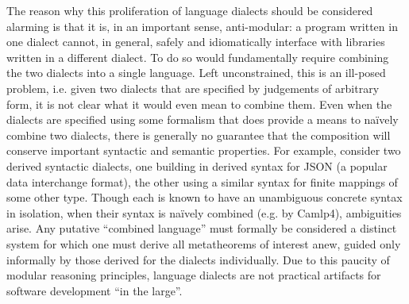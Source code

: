 The reason why this proliferation of language dialects should be considered alarming is that it is, in an important sense,  anti-modular: a program written in one dialect cannot, in general, safely and idiomatically interface with libraries written in a different dialect. %
To do so would fundamentally require combining the two dialects into a single language. Left unconstrained, this is an ill-posed problem, i.e. given two dialects that are specified by judgements of arbitrary form, it is not clear what it would even mean to combine them. Even when the dialects are specified using some formalism that does provide a means to na\"ively combine two dialects, there is generally no guarantee that the composition will conserve important syntactic and semantic properties. %
For example, consider two derived syntactic dialects, one building in derived syntax for JSON (a popular data interchange format), the other using a similar syntax for finite mappings of some other type. Though each is known to have an unambiguous concrete syntax in isolation, when their syntax is na\"ively  combined (e.g. by Camlp4), ambiguities arise.  Any putative ``combined language'' must formally be considered a  distinct system for which one must derive all metatheorems of interest anew, guided only informally by those derived for the dialects individually. %
Due to this paucity of modular reasoning principles, language dialects are not practical artifacts for software development ``in the large''. %

